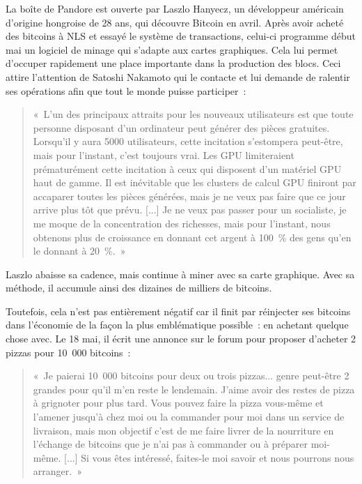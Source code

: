 La boîte de Pandore est ouverte par Laszlo Hanyecz, un développeur américain d'origine hongroise de 28 ans, qui découvre Bitcoin en avril. Après avoir acheté des bitcoins à NLS et essayé le système de transactions, celui-ci programme début mai un logiciel de minage qui s'adapte aux cartes graphiques. Cela lui permet d'occuper rapidement une place importante dans la production des blocs. Ceci attire l'attention de Satoshi Nakamoto qui le contacte et lui demande de ralentir ses opérations afin que tout le monde puisse participer~:

\begin{quote}
«~L'un des principaux attraits pour les nouveaux utilisateurs est que toute personne disposant d'un ordinateur peut générer des pièces gratuites. Lorsqu'il y aura 5000 utilisateurs, cette incitation s'estompera peut-être, mais pour l'instant, c'est toujours vrai. Les GPU limiteraient prématurément cette incitation à ceux qui disposent d'un matériel GPU haut de gamme. Il est inévitable que les clusters de calcul GPU finiront par accaparer toutes les pièces générées, mais je ne veux pas faire que ce jour arrive plus tôt que prévu. [...] Je ne veux pas passer pour un socialiste, je me moque de la concentration des richesses, mais pour l'instant, nous obtenons plus de croissance en donnant cet argent à 100~\% des gens qu'en le donnant à 20~\%.~»
\end{quote}

Laszlo abaisse sa cadence, mais continue à miner avec sa carte graphique. Avec sa méthode, il accumule ainsi des dizaines de milliers de bitcoins.

Toutefois, cela n'est pas entièrement négatif car il finit par réinjecter ses bitcoins dans l'économie de la façon la plus emblématique possible~: en achetant quelque chose avec. Le 18 mai, il écrit une annonce sur le forum pour proposer d'acheter 2 pizzas pour 10~000 bitcoins~:

\begin{quote}
«~Je paierai 10~000 bitcoins pour deux ou trois pizzas... genre peut-être 2 grandes pour qu'il m'en reste le lendemain. J'aime avoir des restes de pizza à grignoter pour plus tard. Vous pouvez faire la pizza vous-même et l'amener jusqu'à chez moi ou la commander pour moi dans un service de livraison, mais mon objectif c'est de me faire livrer de la nourriture en l'échange de bitcoins que je n'ai pas à commander ou à préparer moi-même. [...] Si vous êtes intéressé, faites-le moi savoir et nous pourrons nous arranger.~»
\end{quote}

